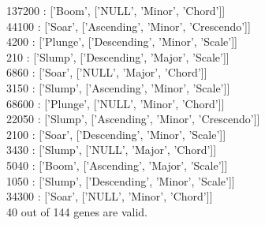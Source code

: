 {137200  :  ['Boom', ['NULL', 'Minor', 'Chord']]\\
44100   :  ['Soar', ['Ascending', 'Minor', 'Crescendo']]\\
4200    :  ['Plunge', ['Descending', 'Minor', 'Scale']]\\
210     :  ['Slump', ['Descending', 'Major', 'Scale']]\\
6860    :  ['Soar', ['NULL', 'Major', 'Chord']]\\
3150    :  ['Slump', ['Ascending', 'Minor', 'Scale']]\\
68600   :  ['Plunge', ['NULL', 'Minor', 'Chord']]\\
22050   :  ['Slump', ['Ascending', 'Minor', 'Crescendo']]\\
2100    :  ['Soar', ['Descending', 'Minor', 'Scale']]\\
3430    :  ['Slump', ['NULL', 'Major', 'Chord']]\\
5040    :  ['Boom', ['Ascending', 'Major', 'Scale']]\\
1050    :  ['Slump', ['Descending', 'Minor', 'Scale']]\\
34300   :  ['Soar', ['NULL', 'Minor', 'Chord']]\\
40  out of  144  genes are valid.}